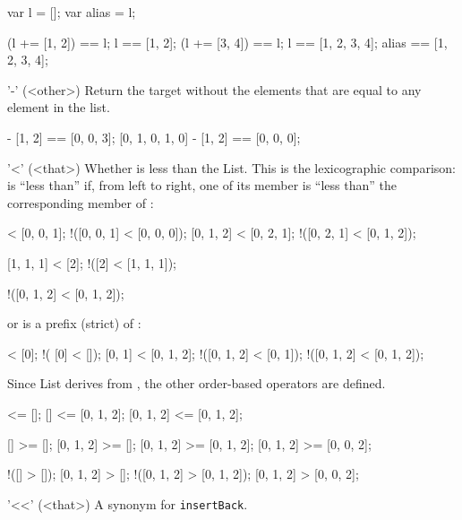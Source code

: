 \begin{urbiscriptapi}
\begin{urbiassert}
var l = [];
var alias = l;

(l += [1, 2]) == l;
l == [1, 2];
(l += [3, 4]) == l;
l == [1, 2, 3, 4];
alias == [1, 2, 3, 4];
\end{urbiassert}


\item['-'](<other>)%
  Return the target without the elements that are equal to any element
  in the  list.

\begin{urbiassert}
[0, 1, 0, 2, 3] - [1, 2] == [0, 0, 3];
[0, 1, 0, 1, 0] - [1, 2] == [0, 0, 0];
\end{urbiassert}


\item['<'](<that>)%
  Whether \this is less than the \that List.  This is the lexicographic
  comparison: \this is ``less than'' \that if, from left to right, one of
  its member is ``less than'' the corresponding member of \that:

\begin{urbiassert}
  [0, 0, 0] < [0, 0, 1];    !([0, 0, 1] < [0, 0, 0]);
  [0, 1, 2] < [0, 2, 1];    !([0, 2, 1] < [0, 1, 2]);

  [1, 1, 1] < [2];          !([2] < [1, 1, 1]);

 !([0, 1, 2] < [0, 1, 2]);
\end{urbiassert}

  \noindent
  or \that is a prefix (strict) of \this:

\begin{urbiassert}
           [] < [0];          !(      [0] < []);
       [0, 1] < [0, 1, 2];    !([0, 1, 2] < [0, 1]);
  !([0, 1, 2] < [0, 1, 2]);
\end{urbiassert}

  Since List derives from , the other order-based
  operators are defined.

\begin{urbiassert}
        [] <= [];
        [] <= [0, 1, 2];
 [0, 1, 2] <= [0, 1, 2];

        [] >= [];
 [0, 1, 2] >= [];
 [0, 1, 2] >= [0, 1, 2];
 [0, 1, 2] >= [0, 0, 2];

       !([] > []);
  [0, 1, 2] > [];
!([0, 1, 2] > [0, 1, 2]);
  [0, 1, 2] > [0, 0, 2];
\end{urbiassert}


\item['<<'](<that>)%
  A synonym for \lstinline|insertBack|.



\end{urbiscriptapi}
